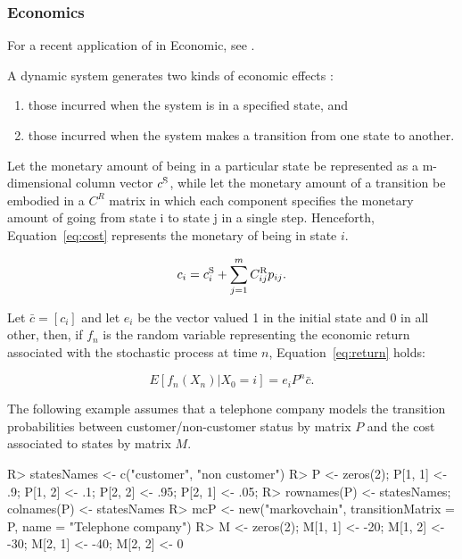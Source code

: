 \documentclass[nojss]{jss}
\begin{document}
\subsubsection{Economics}\label{fin:ec}

For a recent application of  in Economic, see \cite{manchesterR}. 

A dynamic system generates two kinds of economic effects \citep{bardPpt}:
\begin{enumerate}
\item those incurred when the system is in a specified state, and
\item those incurred when the system makes a transition from one state to another.
\end{enumerate}

Let the monetary amount of being in a particular state be represented as a m-dimensional column vector $c^{\rm{S}}$, while let the monetary amount of a transition be embodied in a $C^{R}$ matrix in which each component specifies the monetary amount of going from state i to state j in a single step. Henceforth, Equation~\ref{eq:cost} represents the monetary of being in state $i$.

\begin{equation}
{c_i} = c_i^{\rm{S}} + \sum\limits_{j = 1}^m {C_{ij}^{\rm{R}}} {p_{ij}}.
\label{eq:cost}
\end{equation}

Let $\bar c = \left[ c_i \right]$ and let $e_i$ be the vector valued 1 in the initial state and 0 in all other, then, if $f_n$ is the random variable representing the economic return associated with the stochastic process at time $n$, Equation~\ref{eq:return} holds:

\begin{equation}
E\left[ {{f_n}\left( {{X_n}} \right)|{X_0} = i} \right] = {e_i}{P^n}\bar c.
\label{eq:return}
\end{equation}

The following example assumes that a telephone company models the transition probabilities between customer/non-customer status by matrix $P$ and the cost associated to states by matrix $M$.

\begin{Schunk}
\begin{Sinput}
R> statesNames <- c("customer", "non customer")
R> P <- zeros(2); P[1, 1] <- .9; P[1, 2] <- .1; P[2, 2] <- .95; P[2, 1] <- .05;
R> rownames(P) <- statesNames; colnames(P) <- statesNames
R> mcP <- new("markovchain", transitionMatrix = P, name = "Telephone company")
R> M <- zeros(2); M[1, 1] <- -20; M[1, 2] <- -30; M[2, 1] <- -40; M[2, 2] <- 0
\end{Sinput}
\end{Schunk}
\end{document}
